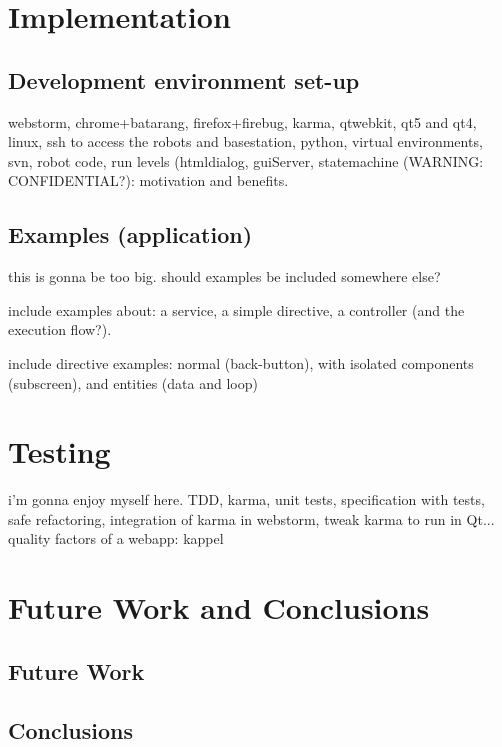 \chapter{Implementation}
\cite{Stefanov} \cite{Crockford} \cite{Darwin} \cite{AngularJSGuide} 

\section{Development environment set-up}
webstorm, chrome+batarang, firefox+firebug, karma, qtwebkit, qt5 and qt4, linux, ssh to access the robots and basestation, python, virtual environments, svn, robot code, run levels (htmldialog, guiServer, statemachine (WARNING: CONFIDENTIAL?): motivation and benefits.

\section{Examples (application)}
this is gonna be too big. should examples be included somewhere else?

include examples about: a service, a simple directive, a controller (and the execution flow?).

include directive examples: normal (back-button), with isolated components (subscreen), and entities (data and loop)

\chapter{Testing}
i'm gonna enjoy myself here.
TDD, karma, unit tests, specification with tests, safe refactoring, integration of karma in webstorm, tweak karma to run in Qt...
quality factors of a webapp: kappel


\chapter{Future Work and Conclusions}
\section{Future Work}
\section{Conclusions}